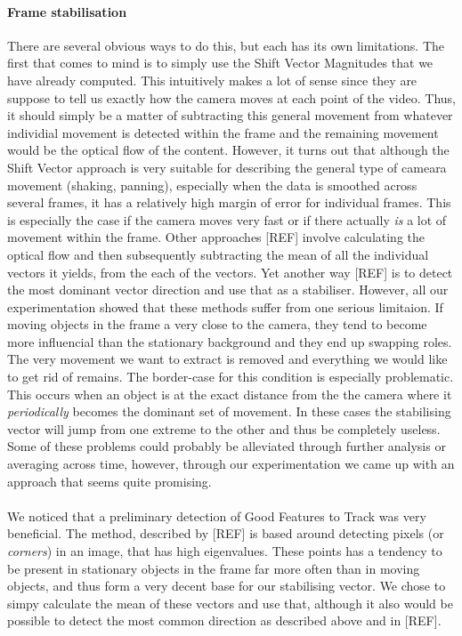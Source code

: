 \paragraph{Frame stabilisation}
%
There are several obvious ways to do this, but each has its own limitations. The first that comes to mind is to simply use the Shift Vector Magnitudes that we have already computed. This intuitively makes a lot of sense since they are suppose to tell us exactly how the camera moves at each point of the video. Thus, it should simply be a matter of subtracting this general movement from whatever individial movement is detected within the frame and the remaining movement would be the optical flow of the content. However, it turns out that although the Shift Vector approach is very suitable for describing the general type of cameara movement (shaking, panning), especially when the data is smoothed across several frames, it has a relatively high margin of error for individual frames. This is especially the case if the camera moves very fast or if there actually \textit{is} a lot of movement within the frame. Other approaches [REF] involve calculating the optical flow and then subsequently subtracting the mean of all the individual vectors it yields, from the each of the vectors. Yet another way [REF] is to detect the most dominant vector direction and use that as a stabiliser. However, all our experimentation showed that these methods suffer from one serious limitaion. If moving objects in the frame a very close to the camera, they tend to become more influencial than the stationary background and they end up swapping roles. The very movement we want to extract is removed and everything we would like to get rid of remains. The border-case for this condition is especially problematic. This occurs when an object is at the exact distance from the the camera where it \textit{periodically} becomes the dominant set of movement. In these cases the stabilising vector will jump from one extreme to the other and thus be completely useless.\\
Some of these problems could probably be alleviated through further analysis or averaging across time, however, through our experimentation we came up with an approach that seems quite promising.\\\\
%
We noticed that a preliminary detection of Good Features to Track was very beneficial. The method, described by [REF] is based around detecting pixels (or \textit{corners}) in an image, that has high eigenvalues. These points has a tendency to be present in stationary objects in the frame far more often than in moving objects, and thus form a very decent base for our stabilising vector. We chose to simpy calculate the mean of these vectors and use that, although it also would be possible to detect the most common direction as described above and in [REF].
%
